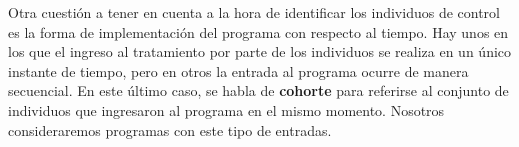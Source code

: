 \documentclass[../main.tex]{subfiles}
\begin{document}
Otra cuestión a tener en cuenta a la hora de identificar los individuos de control es la
forma de implementación del programa con respecto al tiempo. Hay unos en los que el
ingreso al tratamiento por parte de los individuos se realiza en un único instante de
tiempo, pero en otros la entrada al programa ocurre de manera secuencial. En este último
caso, se habla de \textbf{cohorte} para referirse al conjunto de individuos que ingresaron
al programa en el mismo momento. Nosotros consideraremos programas con este tipo
de entradas.





\begin{comment}
 Sin embargo, cuando la entrada al programa ocurre de
manera secuencial, los modelos logísticos no son capaces de gestionar esa probabilidad
variable en el tiempo. Lo que se hace entonces es estimar la probabilidad por camada de
ingreso al programa, es decir se agrupan individuos que hayan ingresado al tratamiento en
temporalidades similares, y se buscan controles separadamente para cada una de estas
camadas.

En este trabajo, exploramos una alternativa distinta para este último caso. Proponemos la
utilización de redes neuronales, específicamente del tipo LSTM \textbf{y
convolucionales????}, capaces de incorporar la dimensión temporal de los datos, para la
detección automática de grupos de control, en el caso particular en que el programa en
cuestión se implementa \textbf{secuencialmente} y existe una \textbf{alta dependencia
temporal} entre una variable observada de los individuos y el momento de ingreso al
tratamiento. El principal objetivo es evaluar el potencial y la efectividad de estas redes
para capturar dependencias dinámicas y características temporales inherentes a los datos
observados, para de esta forma mejorar el proceso de inferencia causal en la evaluación de
impacto.
\end{comment}
\end{document}
